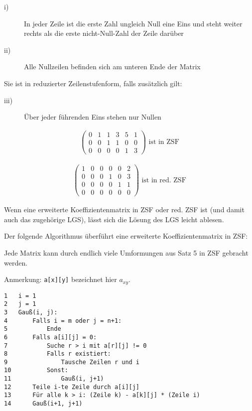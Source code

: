 \begin{description}
\item[i)]{In jeder Zeile ist die erste Zahl ungleich Null eine Eins und steht weiter rechts als die erste nicht-Null-Zahl der Zeile darüber}
\item[ii)]{Alle Nullzeilen befinden sich am unteren Ende der Matrix}
\end{description}
Sie ist in reduzierter Zeilenstufenform, falls zusätzlich gilt:
\begin{description}
\item[iii)]{Über jeder führenden Eins stehen nur Nullen}
\end{description}

\begin{align*}
    \left(\begin{array}{ccccc|c}
        0 & 1 & 1 & 3 & 5 & 1 \\
        0 & 0 & 1 & 1 & 0 & 0 \\
        0 & 0 & 0 & 0 & 1 & 3
    \end{array}\right) \text{ ist in ZSF}
\end{align*}

\begin{align*}
    \left(\begin{array}{ccccc|c}
        1 & 0 & 0 & 0 & 0 & 2 \\
        0 & 0 & 0 & 1 & 0 & 3 \\
        0 & 0 & 0 & 0 & 1 & 1 \\
        0 & 0 & 0 & 0 & 0 & 0
    \end{array}\right) \text{ ist in red. ZSF}
\end{align*}

Wenn eine erweiterte Koeffizientenmatrix in ZSF oder red. ZSF ist (und damit auch das zugehörige LGS), lässt sich die Lösung des LGS leicht ablesen.

Der folgende Algorithmus überführt eine erweiterte Koeffizientenmatrix in ZSF:

Jede Matrix kann durch endlich viele Umformungen aus Satz 5 in ZSF gebracht werden.


Anmerkung: \texttt{a[x][y]} bezeichnet hier $a_{xy}$.
\begin{verbatim}
1   i = 1
2   j = 1
3   Gauß(i, j):
4       Falls i = m oder j = n+1:
5           Ende
6       Falls a[i][j] = 0:
7           Suche r > i mit a[r][j] != 0
8           Falls r existiert:
9               Tausche Zeilen r und i
10          Sonst:
11              Gauß(i, j+1)
12      Teile i-te Zeile durch a[i][j]
13      Für alle k > i: (Zeile k) - a[k][j] * (Zeile i)
14      Gauß(i+1, j+1)
\end{verbatim}

